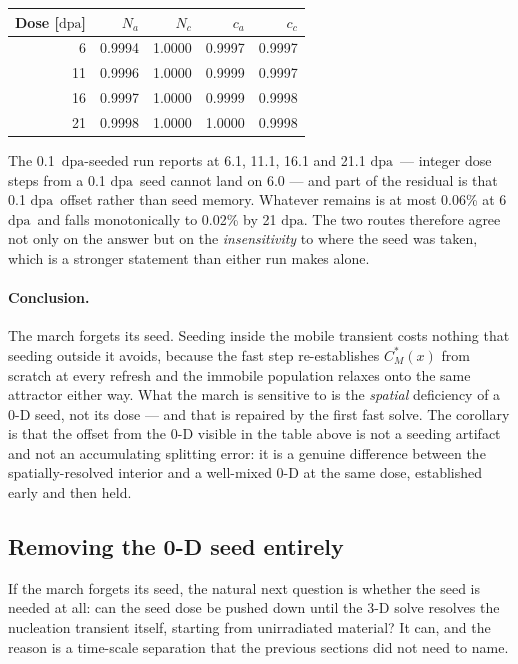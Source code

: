\documentclass[11pt,a4paper]{article}
\newcommand{\dpa}{\ensuremath{\mathrm{dpa}}}
\begin{document}
\begin{center}
\begin{tabular}{rrrrr}
\toprule
Dose [\dpa] & $N_a$ & $N_c$ & $c_a$ & $c_c$ \\
\midrule
 6 & 0.9994 & 1.0000 & 0.9997 & 0.9997 \\
11 & 0.9996 & 1.0000 & 0.9999 & 0.9997 \\
16 & 0.9997 & 1.0000 & 0.9999 & 0.9998 \\
21 & 0.9998 & 1.0000 & 1.0000 & 0.9998 \\
\bottomrule
\end{tabular}
\end{center}

\noindent
The 0.1~\dpa-seeded run reports at 6.1, 11.1, 16.1 and 21.1 \dpa\ --- integer
dose steps from a 0.1 \dpa\ seed cannot land on 6.0 --- and part of the residual
is that 0.1 \dpa\ offset rather than seed memory. Whatever remains is at most
0.06\% at 6 \dpa\ and falls monotonically to 0.02\% by 21 \dpa. The two routes
therefore agree not only on the answer but on the \emph{insensitivity} to where
the seed was taken, which is a stronger statement than either run makes alone.

\paragraph{Conclusion.} The march forgets its seed. Seeding inside the mobile
transient costs nothing that seeding outside it avoids, because the fast step
re-establishes $C_M^*(x)$ from scratch at every refresh and the immobile
population relaxes onto the same attractor either way. What the march is
sensitive to is the \emph{spatial} deficiency of a 0-D seed, not its dose --- and
that is repaired by the first fast solve. The corollary is that the offset from
the 0-D visible in the table above is not a seeding artifact and not an
accumulating splitting error: it is a genuine difference between the
spatially-resolved interior and a well-mixed 0-D at the same dose, established
early and then held.

\subsection{Removing the 0-D seed entirely}
\label{sec:pristine}

If the march forgets its seed, the natural next question is whether the seed is
needed at all: can the seed dose be pushed down until the 3-D solve resolves the
nucleation transient itself, starting from unirradiated material? It can, and
the reason is a time-scale separation that the previous sections did not need to
name.
\end{document}
